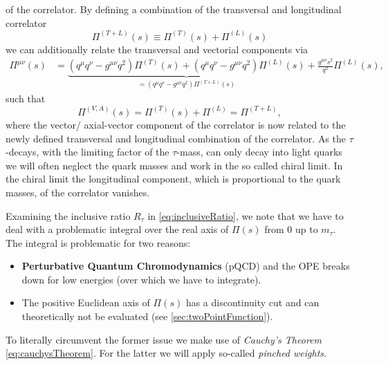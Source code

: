 \documentclass[../../index.tex]{subfiles}
\begin{document}
of the correlator. By defining a combination of the transversal and longitudinal
correlator
\begin{equation}
  \label{eq:correlatorCombination}
  \Pi^{(T+L)}(s) \equiv \Pi^{(T)}(s) + \Pi^{(L)}(s)
\end{equation}
we can additionally relate the transversal and vectorial components via
\begin{equation}
  \label{eq:longitudinalCorrelator}
  \begin{split}
    \Pi^{\mu\nu}(s) &= \underbrace{(q^\mu q^\nu - g^{\mu\nu}q^2)\Pi^{(T)}(s) + (q^\mu q^\nu - g^{\mu\nu} q^2)\Pi^{(L)}(s)}_{=(q^\mu q^\nu - g^{\mu\nu} q^2) \Pi^{(T+L)}(s)} + \frac{g^{\mu\nu}s^2}{q^2}\Pi^{(L)}(s),
  \end{split} 
\end{equation}
such that
\begin{equation}
  \Pi^{(V,A)}(s) = \Pi^{(T)}(s) + \Pi^{(L)} = \Pi^{(T+L)},
\end{equation}
where the vector/ axial-vector component of the correlator is now related to the
newly defined transversal and longitudinal combination of the correlator. As the
$\tau$-decays, with the limiting factor of the $\tau$-mass, can only decay into
light quarks we will often neglect the quark masses and work in the so called
chiral limit. In the chiral limit the longitudinal component, which is 
proportional to the quark masses, of the correlator vanishes.  

Examining the inclusive ratio $R_\tau$ in \cref{eq:inclusiveRatio}, we note that
we have to deal with a problematic integral over the real axis of $\Pi(s)$ from
$0$ up to $m_\tau$. The integral is problematic for two reasons:
\begin{itemize}
  \item \textbf{Perturbative Quantum Chromodynamics} (pQCD) and the OPE breaks down for low
    energies (over which we have to integrate).
  \item The positive Euclidean axis of $\Pi(s)$ has a discontinuity cut and can
    theoretically not be evaluated (see \cref{sec:twoPointFunction}).
\end{itemize}
To literally circumvent the former issue we make use of \textit{Cauchy's Theorem}
\cref{eq:cauchysTheorem}. For the latter we will apply so-called \textit{pinched weights}.
\end{document}

